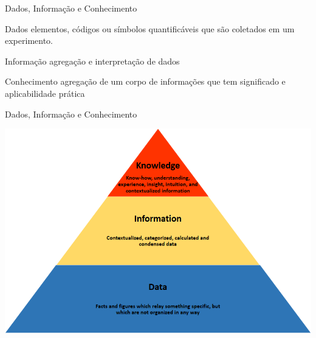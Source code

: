\documentclass{beamer}
\begin{document}


\begin{frame}{Dados, Informação e Conhecimento}
    \begin{block}{Dados}
      elementos, códigos ou símbolos quantificáveis que são
    coletados em um experimento.
    \end{block}
    \begin{block}{Informação}
      agregação e interpretação de dados
    \end{block}
    \begin{block}{Conhecimento}
      agregação de um corpo de informações que tem significado e
      aplicabilidade prática
    \end{block}
\end{frame}


\begin{frame}{Dados, Informação e Conhecimento}
  \begin{center}
    \includegraphics[height=0.9\textheight]{Intro/Knowledge_pyramid}
  \end{center}
\end{frame}
\end{document}
